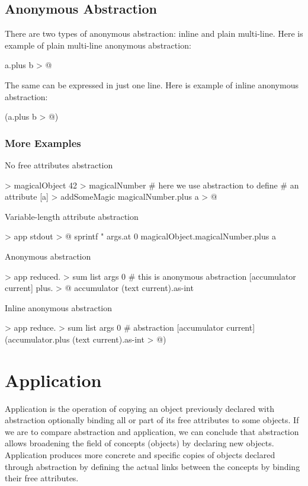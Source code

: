 \documentclass[12pt]{book}
\begin{document}
\subsection{Anonymous Abstraction} \label{subsec:anonymous-abstracion}
There are two types of anonymous abstraction: inline and plain multi-line. Here is example of plain multi-line anonymous abstraction:

\begin{ffcode}
[a b]
  a.plus b > @
\end{ffcode}
The same can be expressed in just one line. Here is example of inline anonymous abstraction:

\begin{ffcode}
[a b] (a.plus b > @)
\end{ffcode}

\subsubsection{More Examples}

No free attributes abstraction
\begin{ffcode}
[] > magicalObject
  42 > magicalNumber
  # here we use abstraction to define
  # an attribute
  [a] > addSomeMagic
    magicalNumber.plus a > @
\end{ffcode}
Variable-length attribute abstraction
\begin{ffcode}
[args...] > app
  stdout > @
    sprintf
      "\n%
      args.at 0
      magicalObject.magicalNumber.plus a
\end{ffcode}
Anonymous abstraction
\begin{ffcode}
[args...] > app
  reduced. > sum
    list args
    0
    # this is anonymous abstraction
    [accumulator current]
      plus. > @
        accumulator
        (text current).as-int
\end{ffcode}
Inline anonymous abstraction
\begin{ffcode}
[args...] > app
  reduce. > sum
    list args
    0
    # abstraction
    [accumulator current] (accumulator.plus (text current).as-int > @)
\end{ffcode}

\section{Application} \label{sec:application}
Application is the operation of copying an object previously declared with abstraction optionally binding all or part of its free attributes to some objects.
If we are to compare abstraction and application, we can conclude that abstraction allows broadening the field of concepts (objects) by declaring new objects. Application produces more concrete and specific copies of objects declared through abstraction by defining the actual links between the concepts by binding their free attributes.
\end{document}
